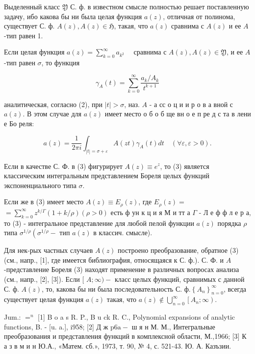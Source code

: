 \documentclass[10pt]{article}
\begin{document}
Выделенный класс $\mathfrak{Y}$ С. ф. в известном смысле полностью решает поставленную задачу, ибо какова бы ни была целая функция $a(z)$, отличная от полинома, существует С. ф. $A(z), A(z) \in \mathfrak{H}$, такая, что $a(z)$ сравнима с $A(z)$ и ее $A$-тип равен 1.



Если целая функция $a(z)=\sum_{k=0}^{\infty} a_{k^{2}} \quad$ сравнима с $A(z), A(z) \in \mathfrak{Y}$, и ее $A$-тип равен $\sigma$, то функция



\[

\gamma_{A}(t)=\sum_{k=0}^{\infty} \frac{a_{k} / A_{k}}{t^{k+1}}

\]



аналитическая, согласно (2), при $|t|>\sigma$, наз. $A$ - а сс о ц и и р о в а вной с $a(z)$. В этом случае для $a(z)$ имеет место о б о б ще вн о е п ре д с та в лени е Бо реля:



\[

a(z)=\frac{1}{2 \pi i} \int_{|t|=\sigma+\varepsilon} A(z t) \gamma_{A}(t) d t \quad(\forall \varepsilon, \varepsilon>0) .

\]



Если в качестве С. Ф. в (3) фигурирует $A(z) \equiv e^{z}$, то (3) является классическим интегральным представлением Бореля целых функций экспоненциального типа $\sigma$.



Если же в (3) имеет место $A(z) \equiv E_{\rho}(z)$, где $E_{\rho}(z)=$ $=\sum_{k=0}^{\infty} z^{k / \Gamma}(1+k / \rho)(\rho>0)$ есть $ф$ ун к ц и я М и тт а $\Gamma$ - Л е ф ф л е р а, то (3) - интегральное представление для любой пелой функции $a(z)$ порядка $\rho$ типа $\sigma^{1 / \rho}\left(\sigma^{1 / \rho}-\right.$ тип $a(z)$ в классич. смысле).



Для нек-рых частных случаев $A(z)$ построено преобразование, обратное (3) (см., напр., [1], где имеется библиография, относящаяся к С. ф.). С. Ф. и $A$-представление Бореля (3) находят применение в различных вопросах анализа (см., напр., [2], [3]). Если [ $A ; \infty)-$ класс целых функций, сравнимых с данной С. ф. $A(z)$, то, какова бы ни была последовательность С. $ф .\left\{A_{n}\right\}_{n=0}^{\infty}$, всегда существует целая функция $a(z)$ такая, что $a(z) \notin \bigcup_{n=0}^{\infty}\left[A_{n} ; \infty\right)$.



Jum.: $=^{n}$ [1] B o a s R. P., B u ck R. C., Polynomial expansions of analytic functions, B. - [u. a.], i958; [2] Д ж $\mathrm{p} 6 \mathrm{a}-$ ш я н М. М., Интегральные преобразования и представления функций в комплексной области, М.,1966; [3] К а з в м и н Ю.А., «Матем. сб.», 1973, т. 90, № 4, с. 521-43. Ю. А. Казъзии.
\end{document}
